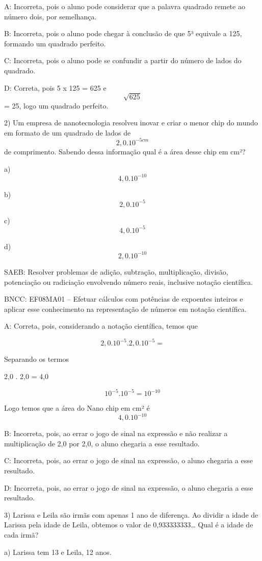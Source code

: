 A: Incorreta, pois o aluno pode considerar que a palavra quadrado remete
ao número dois, por semelhança.

B: Incorreta, pois o aluno pode chegar à conclusão de que 5³ equivale a
125, formando um quadrado perfeito.

C: Incorreta, pois o aluno pode se confundir a partir do número de lados
do quadrado.

D: Correta, pois 5 x 125 = 625 e \[\sqrt{625}\] = 25, logo um quadrado
perfeito.

2) Um empresa de nanotecnologia resolveu inovar e criar o menor chip do
mundo em formato de um quadrado de lados de \[2,0 . 10 ^{-5 cm}\] de
comprimento. Sabendo dessa informação qual é a área desse chip em cm²?

a) \[4,0 . 10^{-10}\]

b) \[2,0 . 10^{-5}\]

c) \[4,0 . 10^{-5}\]

d) \[2,0.10^{-10}\]

SAEB: Resolver problemas de adição, subtração, multiplicação, divisão,
potenciação ou radiciação envolvendo número reais, inclusive notação
científica.

BNCC: EF08MA01 -- Efetuar cálculos com potências de expoentes inteiros e
aplicar esse conhecimento na representação de números em notação
científica.

A: Correta, pois, considerando a notação científica, temos que

\[2,0 . 10^{-5} . 2,0 . 10^{-5} =\]

Separando os termos

2,0 . 2,0 = 4,0

\[10^{-5} . 10^{-5} = 10^{-10}\]

Logo temos que a área do Nano chip em cm² é \[4,0 . 10^{-10}\]

B: Incorreta, pois, ao errar o jogo de sinal na expressão e não realizar
a multiplicação de 2,0 por 2,0, o aluno chegaria a esse resultado.

C: Incorreta, pois, ao errar o jogo de sinal na expressão, o aluno
chegaria a esse resultado.

D: Incorreta, pois, ao errar o jogo de sinal na expressão, o aluno
chegaria a esse resultado.

3) Larissa e Leila são irmãs com apenas 1 ano de diferença. Ao dividir a
idade de Larissa pela idade de Leila, obtemos o valor de
0,933333333\ldots{} Qual é a idade de cada irmã?

a) Larissa tem 13 e Leila, 12 anos.

